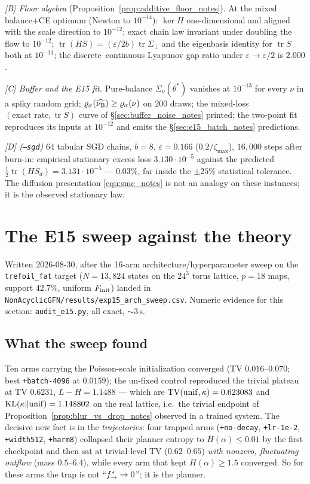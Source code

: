 \documentclass[11pt]{article}
\theoremstyle{definition}
\theoremstyle{remark}
\def\lambda{\widehat\nuB}
\begin{document}
\emph{[B] Floor algebra} (Proposition~\ref{prop:additive_floor_notes}). At the mixed
balance$+$CE optimum (Newton to $10^{-14}$): $\ker H$ one-dimensional and aligned with
the scale direction to $10^{-12}$; exact chain law invariant under doubling the flow to
$10^{-12}$; $\operatorname{tr}(HS)=(\varepsilon/2b)\operatorname{tr}\Sigma_\perp$ and the
eigenbasis identity for $\operatorname{tr}S$ both at $10^{-11}$; the discrete--continuous
Lyapunov gap ratio under $\varepsilon\to\varepsilon/2$ is $2.000$.

\emph{[C] Buffer and the E15 fit.} Pure-balance $\Sigma_\nu(\theta^*)$ vanishes at
$10^{-13}$ for every $\nu$ in a spiky random grid; $\varrho_\sigma(\lambda)\geq
\varrho_\sigma(\nu)$ on $200$ draws; the mixed-loss $(\text{exact rate},
\operatorname{tr}S)$ curve of \S\ref{sec:buffer_noise_notes} printed; the two-point fit
reproduces its inputs at $10^{-12}$ and emits the \S\ref{sec:e15_batch_notes} predictions.

\emph{[D] (\texttt{--sgd})} $64$ tabular SGD chains, $b=8$, $\varepsilon=0.166$
($0.2/\zeta_{\max}$), $16{,}000$ steps after burn-in: empirical stationary excess loss
$3.130\cdot10^{-5}$ against the predicted $\tfrac12\operatorname{tr}(HS_d)=
3.131\cdot10^{-5}$ --- $0.03\%$, far inside the $\pm25\%$ statistical tolerance. The
diffusion presentation \eqref{equ:sme_notes} is not an analogy on these instances; it is the
observed stationary law.

\section{The E15 sweep against the theory}\label{sec:e15_notes}

Written 2026-08-30, after the 16-arm architecture/hyperparameter sweep on the
\texttt{trefoil\_fat} target ($N=13{,}824$ states on the $24^3$ torus lattice, $p=18$
maps, support $42.7\%$, uniform $F_{\mathrm{init}}$) landed in
\texttt{NonAcyclicGFN/results/exp15\_arch\_sweep.csv}. Numeric evidence for this section:
\texttt{audit\_e15.py}, all exact, $\sim$3\,s.

\subsection{What the sweep found}\label{sec:e15_facts_notes}

Ten arms carrying the Poisson-scale initialization converged (TV $0.016$--$0.070$; best
\texttt{+batch-4096} at $0.0159$); the un-fixed control reproduced the trivial plateau at
TV $0.6231$, $L-H=1.1488$ --- which are $\mathrm{TV}(\mathrm{unif},\kappa)=0.623083$ and
$\mathrm{KL}(\kappa\|\mathrm{unif})=1.148802$ on the real lattice, i.e.\ the trivial endpoint of
Proposition~\ref{prop:blur_vs_drop_notes} observed in a trained system. The decisive new fact
is in the \emph{trajectories}: four trapped arms (\texttt{+no-decay}, \texttt{+lr-1e-2},
\texttt{+width512}, \texttt{+harm8}) collapsed their planner entropy to
$H(\alpha)\leq0.01$ by the first checkpoint and then sat at trivial-level TV
($0.62$--$0.65$) \emph{with nonzero, fluctuating outflow} (mass $0.5$--$6.4$), while
every arm that kept $H(\alpha)\geq1.5$ converged. So for these arms the trap is not
``$f^*_{\rightarrow}\rightarrow0$''; it is the planner.
\end{document}
